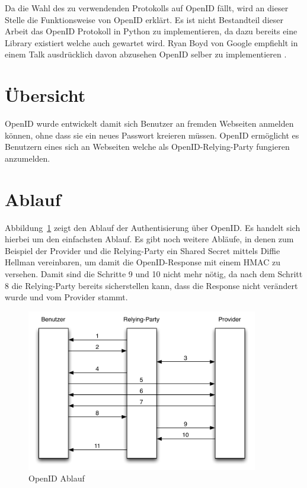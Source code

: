 Da die Wahl des zu verwendenden Protokolls auf OpenID fällt, wird an dieser Stelle die Funktionsweise von OpenID erklärt. Es ist nicht Bestandteil dieser Arbeit das OpenID Protokoll in Python zu implementieren, da dazu bereits eine Library existiert welche auch gewartet wird. Ryan Boyd von Google empfiehlt in einem Talk ausdrücklich davon abzusehen OpenID selber zu implementieren \cite[0:16:08]{googleioopenid}.

\section{Übersicht}
\label{sec:übersicht}
OpenID wurde entwickelt damit sich Benutzer an fremden Webseiten anmelden können, ohne dass sie ein neues Passwort kreieren müssen. OpenID ermöglicht es Benutzern eines  sich an Webseiten welche als \gls{OpenID-Relying-Party} fungieren anzumelden. 

\section{Ablauf}
\label{sec:ablauf}
Abbildung~\ref{fig:openid_ablauf} zeigt den Ablauf der Authentisierung über OpenID. Es handelt sich hierbei um den einfachsten Ablauf. Es gibt noch weitere Abläufe, in denen zum Beispiel der Provider und die Relying-Party ein Shared Secret mittels Diffie Hellman\cite{rfc2631} vereinbaren, um damit die OpenID-Response mit einem HMAC\cite{rfc2104} zu versehen. Damit sind die Schritte 9 und 10 nicht mehr nötig, da nach dem Schritt 8 die Relying-Party bereits sicherstellen kann, dass die Response nicht verändert wurde und vom Provider stammt.
\begin{figure}[H]
  \centering
	\includegraphics[width=0.9\textwidth]{include/openid1.pdf}
	\caption{OpenID Ablauf}
	\label{fig:openid_ablauf}
\end{figure}

